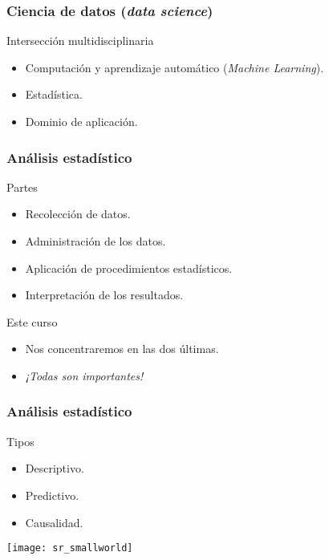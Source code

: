 \documentclass[table]{beamer}
\begin{document}
\begin{frame}
    \frametitle{Ciencia de datos (\emph{data science})}
    \begin{block}{Intersección multidisciplinaria}
        \begin{itemize}
            \item Computación y aprendizaje automático (\emph{Machine Learning}).
            \item Estadística.
            \item Dominio de aplicación.
        \end{itemize}
    \end{block}
\end{frame}

\begin{frame}
    \frametitle{Análisis estadístico}
    \begin{block}{Partes}
        \begin{itemize}
            \item Recolección de datos.
            \item Administración de los datos.
            \item Aplicación de procedimientos estadísticos.
            \item Interpretación de los resultados.
        \end{itemize}
    \end{block}
    \begin{block}{Este curso}
        \begin{itemize}
            \item Nos concentraremos en las dos últimas.
            \item \emph{¡Todas son importantes!}
        \end{itemize}
    \end{block}
\end{frame}

\begin{frame}
    \frametitle{Análisis estadístico}
    \begin{block}{Tipos}
        \begin{itemize}
            \item Descriptivo.
            \item Predictivo.
            \item Causalidad.
        \end{itemize}
    \end{block}
    \begin{center}
        \texttt{[image: sr\_smallworld]}
    \end{center}
\end{frame}
\end{document}
